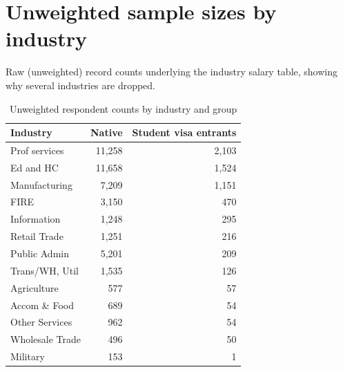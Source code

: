 \documentclass[11pt]{article}
\begin{document}
\section{Unweighted sample sizes by industry}
Raw (unweighted) record counts underlying the industry salary table, showing why several industries are dropped.
\begin{table}[H]
\centering
\caption{Unweighted respondent counts by industry and group}

\begin{tabular}{lrr}
\toprule
Industry & Native & Student visa entrants\\
\midrule
Prof services & 11,258 & 2,103\\
Ed and HC & 11,658 & 1,524\\
Manufacturing & 7,209 & 1,151\\
FIRE & 3,150 & 470\\
Information & 1,248 & 295\\
Retail Trade & 1,251 & 216\\
Public Admin & 5,201 & 209\\
Trans/WH, Util & 1,535 & 126\\
Agriculture & 577 & 57\\
Accom \& Food & 689 & 54\\
Other Services & 962 & 54\\
Wholesale Trade & 496 & 50\\
Military & 153 & 1\\
\bottomrule
\end{tabular}
\end{table}
\end{document}
